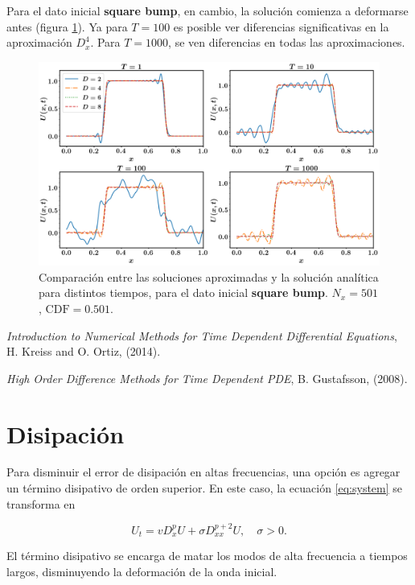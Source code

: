 \documentclass[12pt]{article}
\begin{document}
Para el dato inicial \textbf{square bump}, en cambio, la soluci\'on comienza a deformarse antes (figura \ref{fig:square}). Ya para $T=100$ es posible ver diferencias significativas en la aproximaci\'on $D_x^4$. Para $T=1000$, se ven diferencias en todas las aproximaciones.

\begin{figure}
\center
\includegraphics[scale=0.3]{square.png}
\caption{Comparaci\'on entre las soluciones aproximadas y la soluci\'on anal\'itica para distintos tiempos, para el dato inicial \textbf{square bump}. $N_x=501$, $\mathrm{CDF} = 0.501$.} \label{fig:square}
\end{figure}

\begin{thebibliography}{1}

 {\em Introduction to Numerical Methods for Time Dependent Differential Equations}, H. Kreiss and O. Ortiz, (2014).

 {\em High Order Difference Methods for Time Dependent PDE}, B. Gustafsson, (2008).

\section{Disipaci\'on}

Para disminuir el error de disipaci\'on en altas frecuencias, una opci\'on es agregar un t\'ermino disipativo de orden superior. En este caso, la ecuaci\'on \ref{eq:system} se transforma en 

\begin{equation}
U_t = v D_x^p U + \sigma D_{xx}^{p+2} U, \quad \sigma > 0.
\end{equation}

El t\'ermino disipativo se encarga de matar los modos de alta frecuencia a tiempos largos, disminuyendo la deformaci\'on de la onda inicial.

\end{thebibliography}
\end{document}
